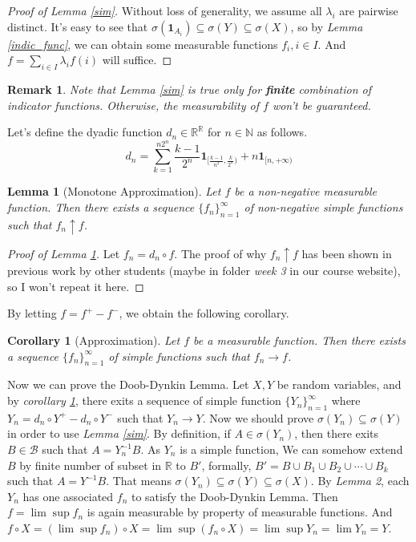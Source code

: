 \documentclass[12pt]{article}
\newcommand\bN{\mathbb{N}}
\newcommand\bR{\mathbb{R}}
\newcommand{\ind}[1]{\mathbf{1}_{#1}}
\newtheorem{lemma}{Lemma}
\newtheorem{corollary}{Corollary}
\newtheorem{remark}{Remark}
\begin{document}
	\begin{proof}[Proof of Lemma \ref{sim}]
		Without loss of generality, we assume all $\lambda_i$ are pairwise distinct. It's easy to see that $\sigma(\ind{A_i})\subseteq\sigma(Y)\subseteq \sigma(X)$, so by \textit{Lemma \ref{indic_func}}, we can obtain some measurable functions $f_i,i\in I$. And $f=\sum_{i\in I} \lambda_i f(i)$ will suffice.
	\end{proof}

	\begin{remark}
		Note that \textit{Lemma \ref{sim}} is true only for \textbf{finite} combination of indicator functions. Otherwise, the measurability of $f$ won't be guaranteed.
	\end{remark}

	Let's define the dyadic function $d_n\in\bR^{\bR}$ for $n\in \bN$ as follows.
	$$d_n=\sum_{k=1}^{n2^n}\frac{k-1}{2^n}\ind{[\frac{k-1}{n^2},\frac{k}{2^n})}+n\ind{[n,+\infty)}$$
	
	\begin{lemma}[Monotone Approximation]\label{ma}
		Let $f$ be a non-negative measurable function. Then there exists a sequence $\{f_n\}_{n=1}^\infty$ of non-negative simple functions such that $f_n\uparrow f$.
	\end{lemma}

	\begin{proof}[Proof of Lemma \ref{ma}]
		Let $f_n=d_n\circ f$. The proof of why $f_n\uparrow f$ has been shown in previous work by other students (maybe in folder \textit{week 3} in our course website), so I won't repeat it here.
	\end{proof}

	By letting $f=f^+-f^-$, we obtain the following corollary.

	\begin{corollary}[Approximation]\label{app}
		Let $f$ be a measurable function. Then there exists a sequence $\{f_n\}_{n=1}^\infty$ of simple functions such that $f_n\rightarrow f$.
	\end{corollary}

	Now we can prove the Doob-Dynkin Lemma. Let $X,Y$ be random variables, and by \textit{corollary \ref{app}}, there exits a sequence of simple function $\{Y_n\}_{n=1}^\infty$ where $Y_n=d_n\circ Y^+-d_n\circ Y^-$ such that $Y_n\rightarrow Y$. Now we should prove $\sigma(Y_n)\subseteq\sigma(Y)$ in order to use \textit{Lemma \ref{sim}}. By definition, if $A\in \sigma(Y_n)$, then there exits $B\in \mathcal{B}$ such that $A=Y_n^{-1}B$. As $Y_n$ is a simple function, We can somehow extend $B$ by finite number of subset in $\bR$ to $B'$, formally, $B'=B\cup B_1\cup B_2\cup\cdots \cup B_k$ such that $A=Y^{-1}B$. That means $\sigma(Y_n)\subseteq\sigma(Y)\subseteq\sigma(X)$. By \textit{Lemma 2}, each $Y_n$ has one associated $f_n$ to satisfy the Doob-Dynkin Lemma. Then $f=\lim\sup f_n$ is again measurable by property of measurable functions. And $f\circ X=(\lim\sup f_n)\circ X=\lim\sup(f_n\circ X)=\lim \sup Y_n=\lim Y_n=Y$.
	
	
	
\end{document}
